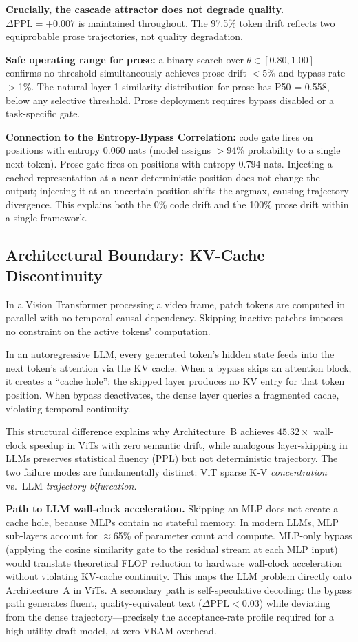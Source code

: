 \documentclass{article}
\begin{document}
\textbf{Crucially, the cascade attractor does not degrade quality.}
$\Delta\mathrm{PPL} = +0.007$ is maintained throughout. The 97.5\% token
drift reflects two equiprobable prose trajectories, not quality
degradation.

\textbf{Safe operating range for prose:} a binary search over
$\theta \in [0.80, 1.00]$ confirms no threshold simultaneously achieves
prose drift $<$5\% and bypass rate $>$1\%. The natural layer-1
similarity distribution for prose has P50 = 0.558, below any selective
threshold. Prose deployment requires bypass disabled or a task-specific
gate.

\textbf{Connection to the Entropy-Bypass Correlation:} code gate fires
on positions with entropy 0.060 nats (model assigns $>$94\% probability
to a single next token). Prose gate fires on positions with entropy
0.794 nats. Injecting a cached representation at a near-deterministic
position does not change the output; injecting it at an uncertain position
shifts the argmax, causing trajectory divergence. This explains both the
0\% code drift and the 100\% prose drift within a single framework.

\subsection{Architectural Boundary: KV-Cache Discontinuity}
\label{sec:llm-kv-boundary}

In a Vision Transformer processing a video frame, patch tokens are
computed in parallel with no temporal causal dependency. Skipping inactive
patches imposes no constraint on the active tokens' computation.

In an autoregressive LLM, every generated token's hidden state feeds
into the next token's attention via the KV cache. When a bypass skips
an attention block, it creates a ``cache hole'': the skipped layer
produces no KV entry for that token position. When bypass deactivates,
the dense layer queries a fragmented cache, violating temporal continuity.

This structural difference explains why Architecture~B achieves
$45.32\times$ wall-clock speedup in ViTs with zero semantic drift, while
analogous layer-skipping in LLMs preserves statistical fluency (PPL) but
not deterministic trajectory. The two failure modes are fundamentally
distinct: ViT sparse K-V \emph{concentration} vs.\ LLM \emph{trajectory
bifurcation}.

\textbf{Path to LLM wall-clock acceleration.} Skipping an MLP does not
create a cache hole, because MLPs contain no stateful memory. In modern
LLMs, MLP sub-layers account for $\approx$65\% of parameter count and
compute. MLP-only bypass (applying the cosine similarity gate to the
residual stream at each MLP input) would translate theoretical FLOP
reduction to hardware wall-clock acceleration without violating KV-cache
continuity. This maps the LLM problem directly onto Architecture~A in
ViTs. A secondary path is self-speculative decoding: the bypass path
generates fluent, quality-equivalent text ($\Delta\mathrm{PPL} < 0.03$)
while deviating from the dense trajectory---precisely the acceptance-rate
profile required for a high-utility draft model, at zero VRAM overhead.
\end{document}
